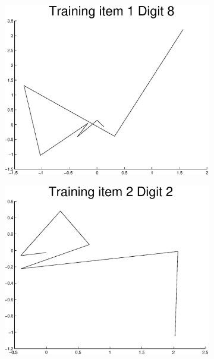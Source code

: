 \documentclass{article}
\begin{document}
	\begin{figure}[H]
	  \begin{subfigure}
	    \centering
	    \includegraphics[scale=0.4]{task1-transformed-digit-1.eps}
	  \end{subfigure}
	  \begin{subfigure}
	    \centering
	    \includegraphics[scale=0.4]{task1-transformed-digit-2.eps}
	  \end{subfigure}
	\end{figure}
\end{document}
